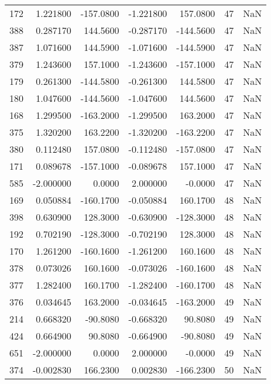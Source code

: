 \begin{tabular}{rrrrrrr}
 172 &    1.221800 & -157.0800 &   -1.221800 &    157.0800 &          47 & NaN \\
 388 &    0.287170 &  144.5600 &   -0.287170 &   -144.5600 &          47 & NaN \\
 387 &    1.071600 &  144.5900 &   -1.071600 &   -144.5900 &          47 & NaN \\
 379 &    1.243600 &  157.1000 &   -1.243600 &   -157.1000 &          47 & NaN \\
 179 &    0.261300 & -144.5800 &   -0.261300 &    144.5800 &          47 & NaN \\
 180 &    1.047600 & -144.5600 &   -1.047600 &    144.5600 &          47 & NaN \\
 168 &    1.299500 & -163.2000 &   -1.299500 &    163.2000 &          47 & NaN \\
 375 &    1.320200 &  163.2200 &   -1.320200 &   -163.2200 &          47 & NaN \\
 380 &    0.112480 &  157.0800 &   -0.112480 &   -157.0800 &          47 & NaN \\
 171 &    0.089678 & -157.1000 &   -0.089678 &    157.1000 &          47 & NaN \\
 585 &   -2.000000 &    0.0000 &    2.000000 &     -0.0000 &          47 & NaN \\
 169 &    0.050884 & -160.1700 &   -0.050884 &    160.1700 &          48 & NaN \\
 398 &    0.630900 &  128.3000 &   -0.630900 &   -128.3000 &          48 & NaN \\
 192 &    0.702190 & -128.3000 &   -0.702190 &    128.3000 &          48 & NaN \\
 170 &    1.261200 & -160.1600 &   -1.261200 &    160.1600 &          48 & NaN \\
 378 &    0.073026 &  160.1600 &   -0.073026 &   -160.1600 &          48 & NaN \\
 377 &    1.282400 &  160.1700 &   -1.282400 &   -160.1700 &          48 & NaN \\
 376 &    0.034645 &  163.2000 &   -0.034645 &   -163.2000 &          49 & NaN \\
 214 &    0.668320 &  -90.8080 &   -0.668320 &     90.8080 &          49 & NaN \\
 424 &    0.664900 &   90.8080 &   -0.664900 &    -90.8080 &          49 & NaN \\
 651 &   -2.000000 &    0.0000 &    2.000000 &     -0.0000 &          49 & NaN \\
 374 &   -0.002830 &  166.2300 &    0.002830 &   -166.2300 &          50 & NaN \\

\end{tabular}
